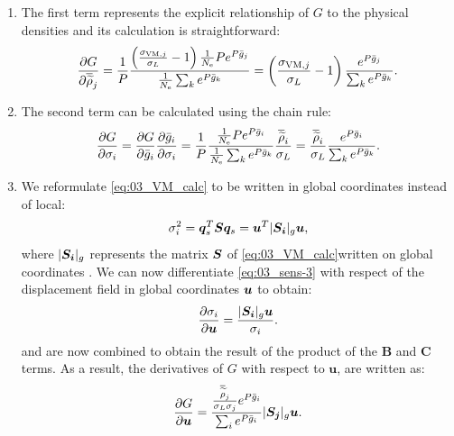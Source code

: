 \begin{enumerate}[label=\Alph* --]
    \item The first term represents the explicit relationship of $G$ to the physical densities and its calculation is straightforward: 
    \begin{equation} \label{eq:03_sens-2-1}
        \frac{\partial G}{\partial \overline{\widetilde{\rho}}_j} = \frac{1}{P} \frac{\left(\frac{ \sigma_{\text{VM},j}}{\sigma_L}-1 \right)\frac{1}{N_\text{e}} P e^{{P}\bar{g}_j}}{\frac{1}{N_\text{e}} \sum_k e^{{P}\bar{g}_k}} = \left(\frac{ \sigma_{\text{VM},j}}{\sigma_L}-1 \right) \frac{e^{{P}\bar{g}_j}}{\sum_k e^{{P}\bar{g}_k}}.
    \end{equation}
    
    \item The second term can be calculated using the chain rule:
    \begin{equation}
        \label{eq:03_sens-2-2}
        \frac{\partial G}{\partial\sigma_i} = \frac{\partial G}{\partial\bar{g}_i} \frac{\partial\bar{g}_i}{\partial\sigma_i} = \frac{1}{P} \frac{\frac{1}{N_\text{e}} P e^{{P}\bar{g}_i}}{\frac{1}{N_\text{e}} \sum_k e^{{P}\bar{g}_k}} \frac{\overline{\widetilde{\rho}}_i}{\sigma_L} = \frac{\overline{\widetilde{\rho}}_i}{\sigma_L} \frac{e^{{P}\bar{g}_i}}{\sum_k e^{{P}\bar{g}_k}}.
    \end{equation}
    
    \item We reformulate \eqref{eq:03_VM_calc} to be written in global coordinates instead of local:
    \begin{equation}
        \label{eq:03_sens-3}
        \sigma_i^2 = \bm{q}_s^T\bm{S}\bm{q}_s = \bm{u}^T |\bm{S_i}|_g \bm{u},
    \end{equation}  
    where $|\bm{S_i}|_g$ represents the matrix $\bm{S}$ of \eqref{eq:03_VM_calc}written on global coordinates . We can now differentiate \eqref{eq:03_sens-3} with respect of the displacement field in global coordinates $\bm{u}$ to obtain:
    \begin{equation}
        \label{eq:03_sens-4}
        \frac{\partial\sigma_i}{\partial\bm{u}} = \frac{|\bm{S_i}|_g \bm{u}}{\sigma_i}.
    \end{equation}
     and  are now combined to obtain the result of the product of the \textbf{B} and \textbf{C} terms. As a result, the derivatives of $G$ with respect to $\bm{u}$, are written as:
    \begin{equation} \label{eq:03_sens-4-1}
        \frac{\partial G}{\partial\bm{u}} = \frac{\frac{\overline{\widetilde{\rho}}_j}{\sigma_L\sigma_j} e^{{P}\bar{g}_i}}{\sum_i e^{{P}\bar{g}_i}} |\bm{S_j}|_g \bm{u}.
    \end{equation}


\end{enumerate}
